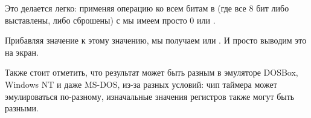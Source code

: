 %
Это делается легко: применяя операцию  ко всем битам в  (где все 8 бит либо выставлены, либо сброшены) с  мы имеем просто 0 или .

%
Прибавляя значение  к этому значению, мы получаем  или .
И просто выводим это на экран.

\subsectionold{\Conclusion{}}

Также стоит отметить, что результат может быть разным в эмуляторе DOSBox, \gls{Windows NT} и даже MS-DOS, 
из-за разных условий:
чип таймера может эмулироваться по-разному, изначальные значения регистров также могут быть разными.
